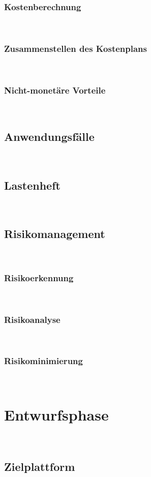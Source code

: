 \documentclass[12pt,toc=sectionentrywithoutdots, headheight=44pt, headings=optiontoheadandtoc]{scrartcl}
\begin{document}
\subsubsection{Kostenberechnung}
\blindtext\

\subsubsection{Zusammenstellen des Kostenplans}
\blindtext\

\subsubsection{Nicht-monetäre Vorteile}
\blindtext\

\subsection{Anwendungsfälle}
\blindtext\

\subsection{Lastenheft}
\blindtext\

\subsection{Risikomanagement}
\blindtext\

\subsubsection{Risikoerkennung}
\blindtext\

\subsubsection{Risikoanalyse}
\blindtext\

\subsubsection{Risikominimierung}
\blindtext\

\section{Entwurfsphase}
\blindtext\

\subsection{Zielplattform}
\blindtext\
\end{document}

